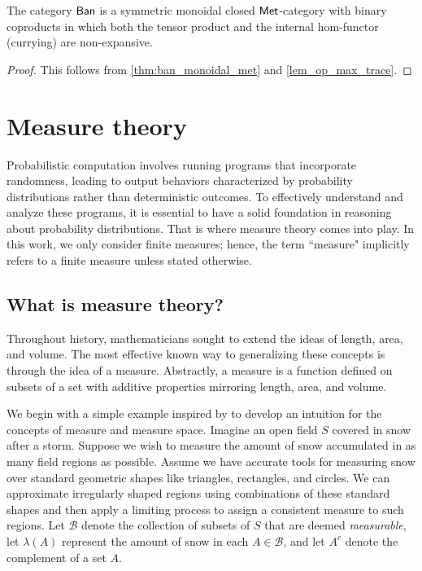   \begin{theorem}
      The category $\mathsf{Ban}$ is a  symmetric monoidal closed $\mathsf{Met}$-category with binary coproducts in which both the tensor product and the internal hom-functor (currying) are non-expansive.
  \end{theorem}

\begin{proof}
  This follows from \autoref{thm:ban_monoidal_met} and \autoref{lem_op_max_trace}.    
\end{proof}



\section{Measure theory}
Probabilistic computation involves running programs that incorporate randomness, leading to output behaviors characterized by probability distributions rather than deterministic outcomes. To effectively understand and analyze these programs, it is essential to have a solid foundation in reasoning about probability distributions. That is where measure theory comes into play.
In this work, we only consider finite measures; hence, the term ``measure" implicitly refers to a finite measure unless stated otherwise.

\subsection{What is measure theory?}

Throughout history, mathematicians sought to extend the ideas of length, area, and volume. The most effective known way to generalizing these concepts is through the idea of a measure. Abstractly, a measure is a function defined on subsets of a set with additive properties mirroring length, area, and volume.

We begin with a simple example inspired by \cite{athreyaMeasureTheoryProbability2006} to develop an intuition for the concepts of measure and measure space.
Imagine an open field $S$ covered in snow after a storm. Suppose we wish to measure the amount of snow accumulated in as many field regions as possible.
Assume we have accurate tools for measuring snow over standard geometric shapes like triangles, rectangles, and circles. 
We can approximate irregularly shaped regions using combinations of these standard shapes and then apply a limiting process to assign a consistent measure to such regions. 
Let $\mathcal{B}$ denote the collection of subsets of $S$ that are deemed \emph{measurable}, let $\lambda(A)$ represent the amount of snow in each $A \in \mathcal{B}$, and let $A^c$ denote the complement of a set $A$.


